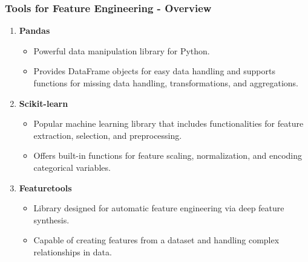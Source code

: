 \documentclass[aspectratio=169]{beamer}
\begin{document}
\begin{frame}[fragile]
    \frametitle{Tools for Feature Engineering - Overview}
    \begin{enumerate}
        \item \textbf{Pandas}
            \begin{itemize}
                \item Powerful data manipulation library for Python.
                \item Provides DataFrame objects for easy data handling and supports functions for missing data handling, transformations, and aggregations.
            \end{itemize}
        
        \item \textbf{Scikit-learn}
            \begin{itemize}
                \item Popular machine learning library that includes functionalities for feature extraction, selection, and preprocessing.
                \item Offers built-in functions for feature scaling, normalization, and encoding categorical variables.
            \end{itemize}
        
        \item \textbf{Featuretools}
            \begin{itemize}
                \item Library designed for automatic feature engineering via deep feature synthesis.
                \item Capable of creating features from a dataset and handling complex relationships in data.
            \end{itemize}
    \end{enumerate}
\end{frame}
\end{document}
